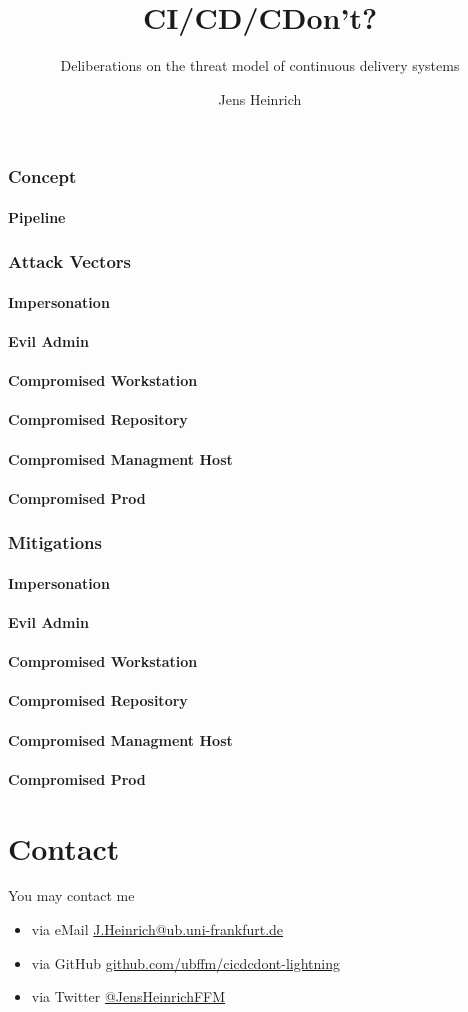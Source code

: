 \documentclass{beamer}
\title{CI/CD/CDon't?}
\subtitle{Deliberations on the threat model of continuous delivery systems}
\date[%
	{\includegraphics[
			keepaspectratio,
			height=3pt
			]
			{cyber.png}
			}%
		CiderSecCon
]{2020--03--14/15\\%
	{\includegraphics[
			keepaspectratio,
			height=7pt
			]
			{cyber.png}
			}%
		CiderSecCon}
\institute[UBFFM]{\href{https://www.ub.uni-frankfurt.de}{Universit\"atsbibliothek Johann Christian Senckenberg}}
\author[J
	{\includegraphics[
		keepaspectratio,
		height=4pt
		]
		{icon.png}
		}
		]{Jens Heinrich}
\begin{document}
\begin{frame}
	\titlepage
\end{frame}

\begin{frame}
	\frametitle<1-1>{Concept}
	\framesubtitle<1-1>{Pipeline}
	\frametitle<2-7>{Attack Vectors}
	\framesubtitle<2-2>{Impersonation}
	\framesubtitle<3-3>{Evil Admin}
	\framesubtitle<4-4>{Compromised Workstation}
	\framesubtitle<5-5>{Compromised Repository}
	\framesubtitle<6-6>{Compromised Managment Host}
	\framesubtitle<7-7>{Compromised Prod}
	\frametitle<8-13>{Mitigations}
	\framesubtitle<8-8>{Impersonation}
	\framesubtitle<9-9>{Evil Admin}
	\framesubtitle<10-10>{Compromised Workstation}
	\framesubtitle<11-11>{Compromised Repository}
	\framesubtitle<12-12>{Compromised Managment Host}
	\framesubtitle<13-13>{Compromised Prod}
	
\end{frame}

\section{Contact}
\begin{frame}
	You may contact me
	\begin{itemize}
		\item via eMail \href{mailto://J.Heinrich@ub.uni-frankfurt.de}{\url{J.Heinrich@ub.uni-frankfurt.de}} \\
		\item via GitHub \href{https://github.com/ubffm/cicdcdont-lightning}{\url{github.com/ubffm/cicdcdont-lightning}} \\
		\item via Twitter \href{https://twitter.com/JensHeinrichFFM}{@JensHeinrichFFM}
	\end{itemize}
\end{frame}
\end{document}
